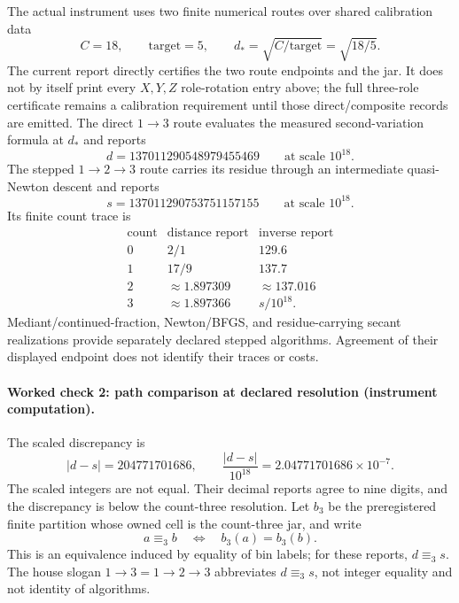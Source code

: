 The actual instrument uses two finite numerical routes over shared calibration data
\[
                        C=18,\qquad \text{target}=5,\qquad
                        d_*=\sqrt{C/\text{target}}=\sqrt{18/5}.
\]
The current report directly certifies the two route endpoints and the jar.  It does not by itself print every
\(X,Y,Z\) role-rotation entry above; the full three-role certificate remains a calibration requirement until those
direct/composite records are emitted.
The direct \(1\to3\) route evaluates the measured second-variation formula at \(d_*\) and reports
\[
             d=137011290548979455469\qquad\text{at scale }10^{18}.
\]
The stepped \(1\to2\to3\) route carries its residue through an intermediate quasi-Newton descent and reports
\[
             s=137011290753751157155\qquad\text{at scale }10^{18}.
\]
Its finite count trace is
\[
\begin{array}{c|c|c}
\text{count}&\text{distance report}&\text{inverse report}\\
\hline
0&2/1&129.6\\
1&17/9&137.7\\
2&\approx1.897309&\approx137.016\\
3&\approx1.897366&s/10^{18}.
\end{array}
\]
Mediant/continued-fraction, Newton/BFGS, and residue-carrying secant realizations provide separately declared stepped
algorithms.  Agreement of their displayed endpoint does not identify their traces or costs.

\paragraph{Worked check 2: path comparison at declared resolution (instrument computation).}
The scaled discrepancy is
\[
 |d-s|=204771701686,\qquad
 \frac{|d-s|}{10^{18}}
 =2.04771701686\times10^{-7}.
\]
The scaled integers are not equal.  Their decimal reports agree to nine digits, and the discrepancy is below the
count-three resolution.  Let \(b_3\) be the preregistered finite partition whose owned cell is the count-three jar, and
write
\[
                        a\equiv_3 b\quad\Longleftrightarrow\quad b_3(a)=b_3(b).
\]
This is an equivalence induced by equality of bin labels; for these reports, \(d\equiv_3s\).  The house slogan
\(1\to3=1\to2\to3\) abbreviates \(d\equiv_3s\), not integer equality and not identity of algorithms.

